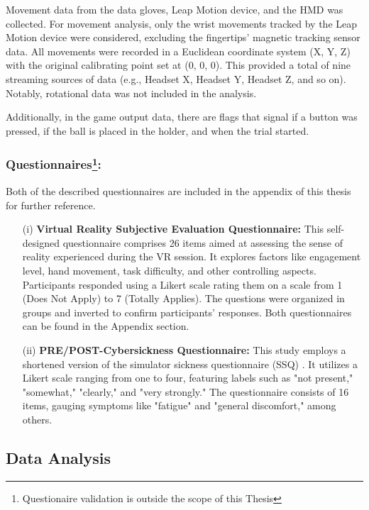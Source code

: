 \documentclass[12pt,oneside,openright]{report}
\begin{document}
Movement data from the data gloves, Leap Motion device, and the HMD was collected. For movement analysis, only the wrist movements tracked by the Leap Motion device were considered, excluding the fingertips' magnetic tracking sensor data. All movements were recorded in a Euclidean coordinate system (X, Y, Z) with the original calibrating point set at (0, 0, 0). This provided a total of nine streaming sources of data (e.g., Headset X, Headset Y, Headset Z, and so on). Notably, rotational data was not included in the analysis.

Additionally, in the game output data, there are flags that signal if a button was pressed, if the ball is placed in the holder, and when the trial started.

\subsubsection*{Questionnaires\footnote{Questionaire validation is outside the scope of this Thesis}:}
Both of the described questionnaires are included in the appendix of this thesis for further reference.

\begin{enumerate}
\item[(i)] \textbf{Virtual Reality Subjective Evaluation Questionnaire:} This self-designed questionnaire comprises 26 items aimed at assessing the sense of reality experienced during the VR session. It explores factors like engagement level, hand movement, task difficulty, and other controlling aspects. Participants responded using a Likert scale rating them on a scale from 1 (Does Not Apply) to 7 (Totally Applies). The questions were organized in groups and inverted to confirm participants' responses. Both questionnaires can be found in the Appendix section.

\item[(ii)] \textbf{PRE/POST-Cybersickness Questionnaire:} This study employs a shortened version of the simulator sickness questionnaire (SSQ) \parencite*{avpsy}. It utilizes a Likert scale ranging from one to four, featuring labels such as "not present," "somewhat," "clearly," and "very strongly." The questionnaire consists of 16 items, gauging symptoms like "fatigue" and "general discomfort," among others.
\end{enumerate}

\subsection*{Data Analysis}
\end{document}

